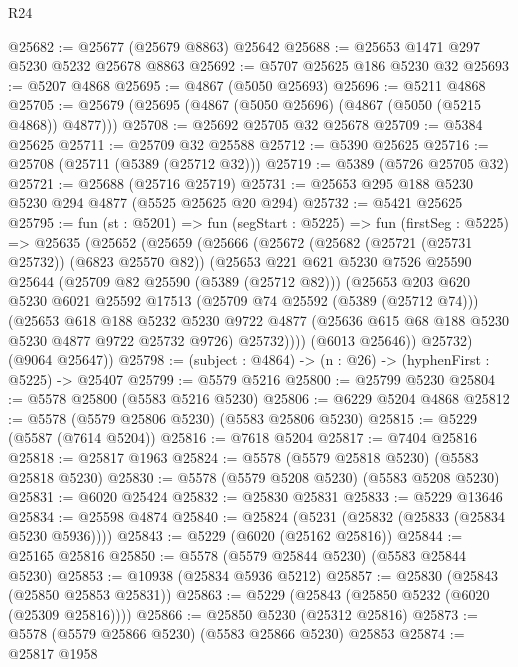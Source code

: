 \begin{lexlean}{R24}
\begin{coremodule}
@25682 := @25677 (@25679 @8863) @25642
@25688 := @25653 @1471 @297 @5230 @5232 @25678 @8863
@25692 := @5707 @25625 @186 @5230 @32
@25693 := @5207 @4868
@25695 := @4867 (@5050 @25693)
@25696 := @5211 @4868
@25705 := @25679 (@25695 (@4867 (@5050 @25696) (@4867 (@5050 (@5215 @4868)) @4877)))
@25708 := @25692 @25705 @32 @25678
@25709 := @5384 @25625
@25711 := @25709 @32 @25588
@25712 := @5390 @25625
@25716 := @25708 (@25711 (@5389 (@25712 @32)))
@25719 := @5389 (@5726 @25705 @32)
@25721 := @25688 (@25716 @25719)
@25731 := @25653 @295 @188 @5230 @5230 @294 @4877 (@5525 @25625 @20 @294)
@25732 := @5421 @25625
@25795 := fun (st : @5201) =>
  fun (segStart : @5225) =>
  fun (firstSeg : @5225) =>
  @25635
    (@25652
      (@25659
        (@25666
          (@25672
            (@25682 (@25721 (@25731 @25732)) (@6823 @25570 @82))
            (@25653
              @221
              @621
              @5230
              @7526
              @25590
              @25644
              (@25709 @82 @25590 (@5389 (@25712 @82)))
              (@25653
                @203
                @620
                @5230
                @6021
                @25592
                @17513
                (@25709 @74 @25592 (@5389 (@25712 @74)))
                (@25653
                  @618
                  @188
                  @5232
                  @5230
                  @9722
                  @4877
                  (@25636 @615 @68 @188 @5230 @5230 @4877 @9722 @25732 @9726)
                  @25732))))
          (@6013 @25646))
        @25732)
      (@9064 @25647))
@25798 := (subject : @4864) -> (n : @26) -> (hyphenFirst : @5225) -> @25407
@25799 := @5579 @5216
@25800 := @25799 @5230
@25804 := @5578 @25800 (@5583 @5216 @5230)
@25806 := @6229 @5204 @4868
@25812 := @5578 (@5579 @25806 @5230) (@5583 @25806 @5230)
@25815 := @5229 (@5587 (@7614 @5204))
@25816 := @7618 @5204
@25817 := @7404 @25816
@25818 := @25817 @1963
@25824 := @5578 (@5579 @25818 @5230) (@5583 @25818 @5230)
@25830 := @5578 (@5579 @5208 @5230) (@5583 @5208 @5230)
@25831 := @6020 @25424
@25832 := @25830 @25831
@25833 := @5229 @13646
@25834 := @25598 @4874
@25840 := @25824 (@5231 (@25832 (@25833 (@25834 @5230 @5936))))
@25843 := @5229 (@6020 (@25162 @25816))
@25844 := @25165 @25816
@25850 := @5578 (@5579 @25844 @5230) (@5583 @25844 @5230)
@25853 := @10938 (@25834 @5936 @5212)
@25857 := @25830 (@25843 (@25850 @25853 @25831))
@25863 := @5229 (@25843 (@25850 @5232 (@6020 (@25309 @25816))))
@25866 := @25850 @5230 (@25312 @25816)
@25873 := @5578 (@5579 @25866 @5230) (@5583 @25866 @5230) @25853
@25874 := @25817 @1958

\end{coremodule}
\end{lexlean}

